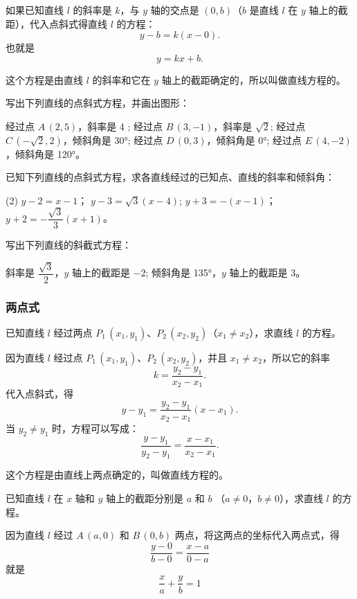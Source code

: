 如果已知直线 $l$ 的斜率是 $k$，与 $y$ 轴的交点是 $(0,b)$（$b$ 是直线 $l$ 在 $y$ 轴上的截距），代入点斜式得直线 $l$ 的方程：
\[ y-b=k(x-0). \]
也就是
\[ y=kx+b. \]

这个方程是由直线 $l$ 的斜率和它在 $y$ 轴上的截距确定的，所以叫做直线方程的。

\begin{Practice}
  \begin{question}
    \item 写出下列直线的点斜式方程，并画出图形：
    \begin{tasks}
      \task 经过点 $A\,(2,5)$，斜率是 4 ;
      \task 经过点 $B\,(3,-1)$，斜率是 $\sqrt{2}$;
      \task 经过点 $C\,(-\sqrt{2},2)$，倾斜角是 \ang{30};
      \task 经过点 $D\,(0,3)$，倾斜角是 \ang{0};
      \task 经过点 $E\,(4,-2)$，倾斜角是 \ang{120}。
    \end{tasks}
    \item 已知下列直线的点斜式方程，求各直线经过的已知点、直线的斜率和倾斜角：
    \begin{tasks}(2)
      \task $y-2=x - 1$；
      \task $y-3=\sqrt{3}(x-4)$;
      \task $y+3=-(x-1)$；
      \task $y+2=-\dfrac{\sqrt{3}}{3}(x+1) $。
    \end{tasks}
    \item 写出下列直线的斜截式方程：
    \begin{tasks}
      \task 斜率是 $\dfrac{\sqrt{3}}{2}$，$y$ 轴上的截距是 $-2$;
      \task 倾斜角是 \ang{135}，$y$ 轴上的截距是 3。
    \end{tasks}
  \end{question}
\end{Practice}

\subsubsection{两点式}
已知直线 $l$ 经过两点 $P_1\,(x_1,y_1)$、$P_2\,(x_2,y_2)$（$x_1\neq x_2$），求直线 $l$ 的方程。

因为直线 $l$ 经过点 $P_1\,(x_1,y_1)$、$P_2\,(x_2,y_2)$，并且 $x_1\neq x_2$，所以它的斜率 
\[k = \frac{y_2-y_1}{x_2-x_1}.\] 
代入点斜式，得
\[ y-y_1 =\frac{y_2-y_1}{x_2-x_1}(x-x_1).\]
当 $y_2\neq y_1$ 时，方程可以写成：
\[ \frac{y-y_1}{y_2-y_1} = \frac{x-x_1}{x_2-x_1}.\]

这个方程是由直线上两点确定的，叫做直线方程的。
\begin{example}
  已知直线 $l$ 在 $x$ 轴和 $y$ 轴上的截距分别是 $a$ 和 $b$ （$a\neq 0$，$b\neq 0$），求直线 $l$ 的方程。
\end{example}
\begin{solution}
  因为直线 $l$ 经过 $A\,(a,0)$ 和 $B\,(0,b)$ 两点，将这两点的坐标代入两点式，得
\[ \frac{y-0}{b-0} = \frac{x-a}{0-a} \]
就是
\[ \frac{x}{a} + \frac{y}{b} = 1 \]
\end{solution}

